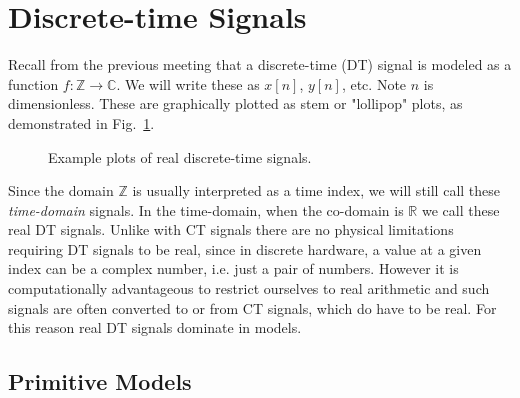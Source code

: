 \section{Discrete-time Signals}

Recall from the previous meeting that a discrete-time (DT) signal is modeled as a function $f: \mathbb{Z} \rightarrow \mathbb{C}$. We will write these as $x[n]$, $y[n]$, etc. Note $n$ is dimensionless. These are graphically plotted as stem or "lollipop" plots, as demonstrated in Fig.~\ref{fig:dtplots}.

\begin{figure}[ht]
\begin{center}
\end{center}
\caption{Example plots of real discrete-time signals.}
\label{fig:dtplots}
\end{figure}

Since the domain $\mathbb{Z}$ is usually interpreted as a time index, we will still call these {\it time-domain} signals. In the time-domain, when the co-domain is $\mathbb{R}$ we call these real DT signals. Unlike with CT signals there are no physical limitations requiring DT signals to be real, since in discrete hardware, a value at a given index can be a complex number, i.e. just a pair of numbers. However it is computationally advantageous to restrict ourselves to real arithmetic and such signals are often converted to or from CT signals, which do have to be real. For this reason real DT signals dominate in models.

\subsection{Primitive Models}

